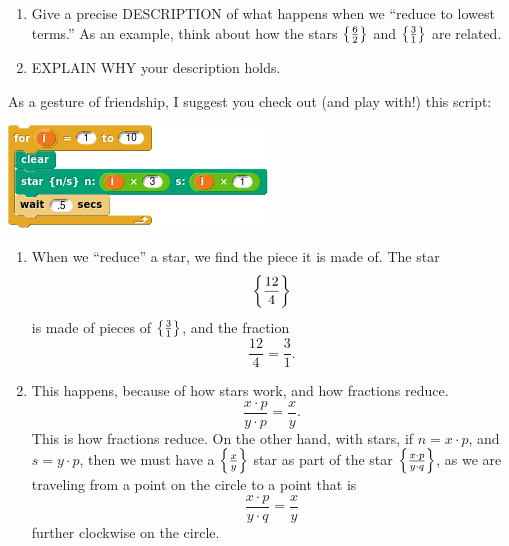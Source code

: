 \documentclass[noauthor,nooutcomes,hints,handout]{ximera}
\begin{document}
\begin{question}
  \begin{enumerate}
  \item Give a precise DESCRIPTION of what happens when we ``reduce to
    lowest terms.'' As an example, think about how the stars
    $\left\{\frac{6}{2}\right\}$ and $\left\{\frac{3}{1}\right\}$ are related.
  \item EXPLAIN WHY your description holds.
  \end{enumerate}
  As a gesture of friendship, I suggest you check out (and play with!)
  this script:
  \begin{center}
    \includegraphics{starSeq.png}
  \end{center}
  \begin{freeResponse}
    \begin{enumerate}
      \item When we ``reduce'' a star, we find the piece it is made
        of.  The star
        \[
        \left\{\frac{12}{4}\right\}
        \]
        is made of pieces of $\left\{\frac{3}{1}\right\}$, and the fraction
        \[
        \frac{12}{4} = \frac{3}{1}.
        \]
      \item This happens, because of how stars work, and how fractions reduce.
        \[
        \frac{x\cdot p}{y\cdot p} =  \frac{x}{y}.
        \]
        This is how fractions reduce. On the other hand, with stars,
        if $n=x\cdot p$, and $s=y\cdot p$, then we must have a
        $\left\{\frac{x}{y}\right\}$ star as part of the star
        $\left\{\frac{x\cdot p}{y\cdot q}\right\}$, as we are traveling from a
        point on the circle to a point that is
        \[
        \frac{x\cdot p}{y\cdot q} =  \frac{x}{y}
        \]
        further clockwise on the circle.
    \end{enumerate}
  \end{freeResponse}
\end{question}

\mynewpage
\end{document}
